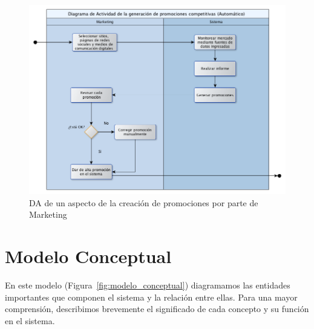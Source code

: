 \begin{figure}[h!]
  \centering
  \includegraphics[width=1\textwidth]{./imagenes/da_marketing.png}
  \caption{DA de un aspecto de la creación de promociones por parte de Marketing}
  \label{fig:da_marketing}
\end{figure}

\clearpage

\section{Modelo Conceptual}

En este modelo (Figura~\ref{fig:modelo_conceptual}) diagramamos las entidades importantes que componen el sistema y la relación entre ellas.
Para una mayor comprensión, describimos brevemente el significado de cada concepto y su función en el sistema.


